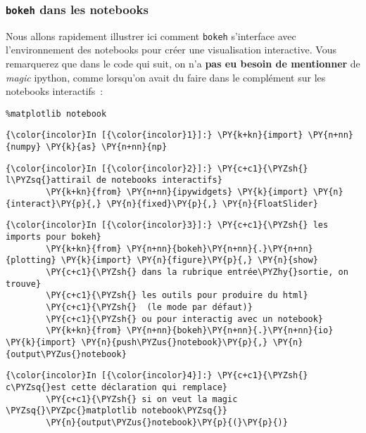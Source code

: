     \hypertarget{bokeh-dans-les-notebooks}{%
\subsubsection{\texorpdfstring{\texttt{bokeh} dans les
notebooks}{bokeh dans les notebooks}}\label{bokeh-dans-les-notebooks}}

    Nous allons rapidement illustrer ici comment \texttt{bokeh} s'interface
avec l'environnement des notebooks pour créer une visualisation
interactive. Vous remarquerez que dans le code qui suit, on n'a
\textbf{pas eu besoin de mentionner} de \emph{magic} ipython, comme
lorsqu'on avait du faire dans le complément sur les notebooks
interactifs~:

\begin{verbatim}
%matplotlib notebook
\end{verbatim}

    \begin{Verbatim}[commandchars=\\\{\}]
{\color{incolor}In [{\color{incolor}1}]:} \PY{k+kn}{import} \PY{n+nn}{numpy} \PY{k}{as} \PY{n+nn}{np}
\end{Verbatim}


    \begin{Verbatim}[commandchars=\\\{\}]
{\color{incolor}In [{\color{incolor}2}]:} \PY{c+c1}{\PYZsh{} l\PYZsq{}attirail de notebooks interactifs}
        \PY{k+kn}{from} \PY{n+nn}{ipywidgets} \PY{k}{import} \PY{n}{interact}\PY{p}{,} \PY{n}{fixed}\PY{p}{,} \PY{n}{FloatSlider}
\end{Verbatim}


    \begin{Verbatim}[commandchars=\\\{\}]
{\color{incolor}In [{\color{incolor}3}]:} \PY{c+c1}{\PYZsh{} les imports pour bokeh}
        \PY{k+kn}{from} \PY{n+nn}{bokeh}\PY{n+nn}{.}\PY{n+nn}{plotting} \PY{k}{import} \PY{n}{figure}\PY{p}{,} \PY{n}{show}
        \PY{c+c1}{\PYZsh{} dans la rubrique entrée\PYZhy{}sortie, on trouve}
        \PY{c+c1}{\PYZsh{} les outils pour produire du html}
        \PY{c+c1}{\PYZsh{}  (le mode par défaut)}
        \PY{c+c1}{\PYZsh{} ou pour interactig avec un notebook}
        \PY{k+kn}{from} \PY{n+nn}{bokeh}\PY{n+nn}{.}\PY{n+nn}{io} \PY{k}{import} \PY{n}{push\PYZus{}notebook}\PY{p}{,} \PY{n}{output\PYZus{}notebook}
\end{Verbatim}


    \begin{Verbatim}[commandchars=\\\{\}]
{\color{incolor}In [{\color{incolor}4}]:} \PY{c+c1}{\PYZsh{} c\PYZsq{}est cette déclaration qui remplace}
        \PY{c+c1}{\PYZsh{} si on veut la magic  \PYZsq{}\PYZpc{}matplotlib notebook\PYZsq{}}
        \PY{n}{output\PYZus{}notebook}\PY{p}{(}\PY{p}{)}
\end{Verbatim}


